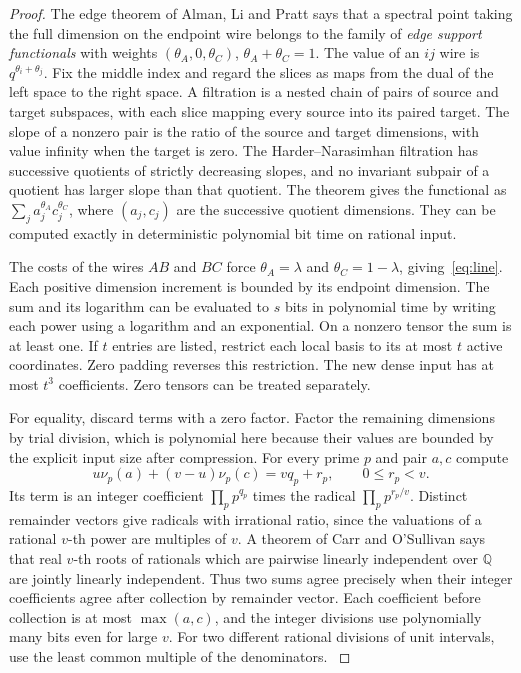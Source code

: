 \documentclass[11pt,letterpaper]{article}
\theoremstyle{definition}
\newcommand{\Q}{\mathbb Q}
\begin{document}
\begin{proof}
The edge theorem of Alman, Li and Pratt says that a spectral point taking
the full dimension on the endpoint wire belongs to the family of
\emph{edge support functionals} with weights \((\theta_A,0,\theta_C)\),
\(\theta_A+\theta_C=1\). The value of an \(ij\) wire is \(q^{\theta_i+\theta_j}\).
Fix the middle index and regard the slices as maps from the dual of the
left space to the right space. A filtration is a nested chain of pairs of
source and target subspaces, with each slice mapping every source into
its paired target. The slope of a nonzero pair is the ratio of the source
and target dimensions, with value infinity when the target is zero.
The Harder--Narasimhan filtration has successive quotients of strictly
decreasing slopes, and no invariant subpair of a quotient has larger slope
than that quotient. The theorem gives the functional as
\(\sum_j a_j^{\theta_A}c_j^{\theta_C}\), where \((a_j,c_j)\) are the
successive quotient dimensions. They can be computed exactly in
deterministic polynomial bit time on rational input.
\cite[Theorems 1.2 and 1.6, Corollary 9.2 and Remark 9.3]{alp-edge}

The costs of the wires \(AB\) and \(BC\) force
\(\theta_A=\lambda\) and \(\theta_C=1-\lambda\), giving~\eqref{eq:line}.
Each positive dimension increment is bounded by its endpoint dimension.
The sum and its logarithm can be evaluated to \(s\) bits in polynomial
time by writing each power using a logarithm and an exponential. On a
nonzero tensor the sum is at least one. If \(t\) entries are listed,
restrict each local basis to its at most \(t\) active coordinates.
Zero padding reverses this restriction. The new dense input has at most
\(t^3\) coefficients. Zero tensors can be treated separately.

For equality, discard terms with a zero factor. Factor the remaining
dimensions by trial division, which is polynomial here because their
values are bounded by the explicit input size after compression. For
every prime \(p\) and pair \(a,c\) compute
\[
 u\nu_p(a)+(v-u)\nu_p(c)=v q_p+r_p,\qquad 0\le r_p<v .
\]
Its term is an integer coefficient \(\prod_p p^{q_p}\) times the radical
\(\prod_p p^{r_p/v}\). Distinct remainder vectors give radicals with
irrational ratio, since the valuations of a rational \(v\)-th power
are multiples of \(v\). A theorem of Carr and O'Sullivan says that real
\(v\)-th roots of rationals which are pairwise linearly independent over
\(\Q\) are jointly linearly independent. Thus two sums agree precisely
when their integer coefficients agree after collection by remainder
vector. Each coefficient before collection is at most \(\max(a,c)\),
and the integer divisions use polynomially many bits even for large \(v\).
For two different rational divisions of unit intervals, use the least common
multiple of the denominators. \cite[Theorem~1.1]{carr-osullivan-roots}


\end{proof}
\end{document}
